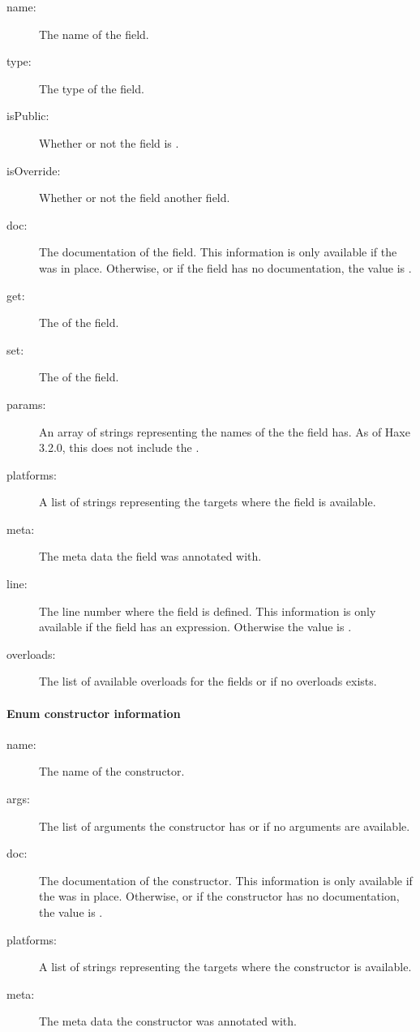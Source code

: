 \begin{description}
	\item[name:] The name of the field.
	\item[type:] The type of the field.
	\item[isPublic:] Whether or not the field is .
	\item[isOverride:] Whether or not the field  another field.
	\item[doc:] The documentation of the field. This information is only available if the   was in place. Otherwise, or if the field has no documentation, the value is .
	\item[get:] The  of the field.
	\item[set:] The  of the field.
	\item[params:] An array of strings representing the names of the  the field has. As of Haxe 3.2.0, this does not include the .
	\item[platforms:] A list of strings representing the targets where the field is available.
	\item[meta:] The meta data the field was annotated with.
	\item[line:] The line number where the field is defined. This information is only available if the field has an expression. Otherwise the value is .
	\item[overloads:] The list of available overloads for the fields or  if no overloads exists.
\end{description}

\paragraph{Enum constructor information}
\label{cr-rtti-enum-constructor-information}

\begin{description}
	\item[name:] The name of the constructor.
	\item[args:] The list of arguments the constructor has or  if no arguments are available.
	\item[doc:] The documentation of the constructor. This information is only available if the   was in place. Otherwise, or if the constructor has no documentation, the value is .
	\item[platforms:] A list of strings representing the targets where the constructor is available.
	\item[meta:] The meta data the constructor was annotated with.
\end{description}
